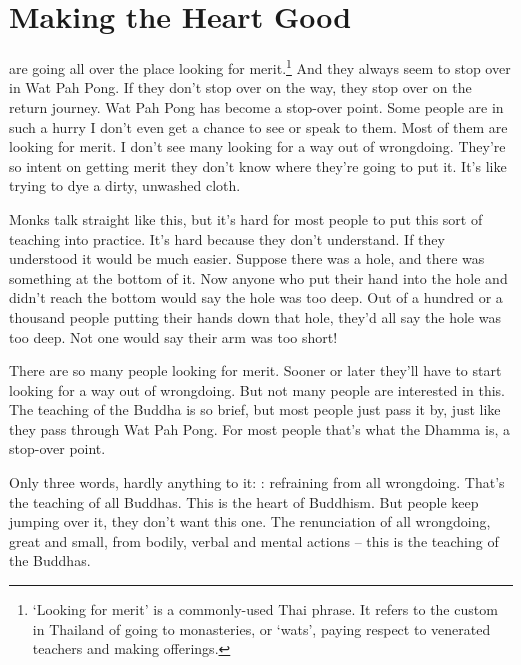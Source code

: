 
\chapter{Making the Heart Good}

 are going all over the place looking for merit.\footnote{`Looking for merit' is a commonly-used Thai phrase. It refers to the custom in Thailand of going to monasteries, or `wats', paying respect to venerated teachers and making offerings.} And they always seem to stop over in Wat Pah Pong. If they don't stop over on the way, they stop over on the return journey. Wat Pah Pong has become a stop-over point. Some people are in such a hurry I don't even get a chance to see or speak to them. Most of them are looking for merit. I don't see many looking for a way out of wrongdoing. They're so intent on getting merit they don't know where they're going to put it. It's like trying to dye a dirty, unwashed cloth.

Monks talk straight like this, but it's hard for most people to put this sort of teaching into practice. It's hard because they don't understand. If they understood it would be much easier. Suppose there was a hole, and there was something at the bottom of it. Now anyone who put their hand into the hole and didn't reach the bottom would say the hole was too deep. Out of a hundred or a thousand people putting their hands down that hole, they'd all say the hole was too deep. Not one would say their arm was too short!

There are so many people looking for merit. Sooner or later they'll have to start looking for a way out of wrongdoing. But not many people are interested in this. The teaching of the Buddha is so brief, but most people just pass it by, just like they pass through Wat Pah Pong. For most people that's what the Dhamma is, a stop-over point.

Only three words, hardly anything to it: : refraining from all wrongdoing. That's the teaching of all Buddhas. This is the heart of Buddhism. But people keep jumping over it, they don't want this one. The renunciation of all wrongdoing, great and small, from bodily, verbal and mental actions -- this is the teaching of the Buddhas.

